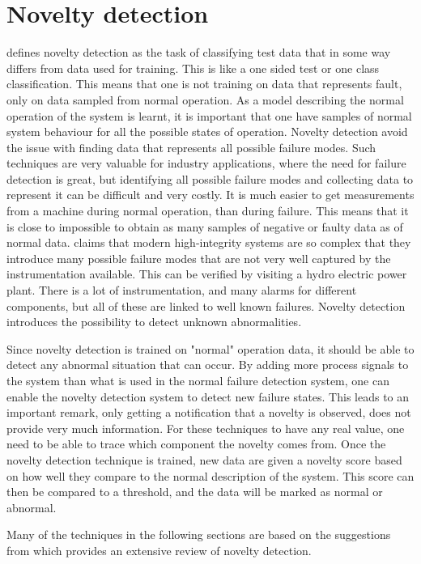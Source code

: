 \section{Novelty detection}\label{sec:novelty_detection}
    \cite{Pimentel2014} defines novelty detection as the task of classifying test data that in some way differs from data used for training. This is like a one sided test or one class classification. This means that one is not training on data that represents fault, only on data sampled from normal operation. As a model describing the normal operation of the system is learnt, it is important that one have samples of normal system behaviour for all the possible states of operation. Novelty detection avoid the issue with finding data that represents all possible failure modes. Such techniques are very valuable for industry applications, where the need for failure detection is great, but identifying all possible failure modes and collecting data to represent it can be difficult and very costly. It is much easier to get measurements from a machine during normal operation, than during failure. This means that it is close to impossible to obtain as many samples of negative or faulty data as of normal data. \cite{Tarassenko2009} claims that modern high-integrity systems are so complex that they introduce many possible failure modes that are not very well captured by the instrumentation available. This can be verified by visiting a hydro electric power plant. There is a lot of instrumentation, and many alarms for different components, but all of these are linked to well known failures. Novelty detection introduces the possibility to detect unknown abnormalities. 
    
    Since novelty detection is trained on "normal" operation data, it should be able to detect any abnormal situation that can occur. By adding more process signals to the system than what is used in the normal failure detection system, one can enable the novelty detection system to detect new failure states. This leads to an important remark, only getting a notification that a novelty is observed, does not provide very much information. For these techniques to have any real value, one need to be able to trace which component the novelty comes from. Once the novelty detection technique is trained, new data are given a novelty score based on how well they compare to the normal description of the system. This score can then be compared to a threshold, and the data will be marked as normal or abnormal.

    Many of the techniques in the following sections are based on the suggestions from \cite{Pimentel2014} which provides an extensive review of novelty detection. 

